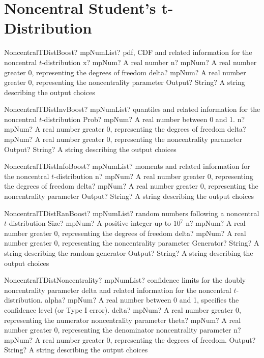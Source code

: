 \documentclass[12pt,a4paper,openany]{book}
\begin{document}
\section{Noncentral Student's t-Distribution}

\begin{mpFunctionsExtract}
\mpFunctionFourNotImplemented
{NoncentralTDistBoost? mpNumList? pdf, CDF and related information for the noncentral $t$-distribution}
{x? mpNum? A real number}
{n? mpNum? A real number greater 0, representing the degrees of freedom}
{delta? mpNum? A real number greater 0, representing the noncentrality parameter}
{Output? String? A string describing the output choices}
\end{mpFunctionsExtract}

\begin{mpFunctionsExtract}
\mpFunctionFourNotImplemented
{NoncentralTDistInvBoost? mpNumList? quantiles and related information for the  noncentral $t$-distribution}
{Prob? mpNum? A real number between 0 and 1.}
{n? mpNum? A real number greater 0, representing the degrees of freedom}
{delta? mpNum? A real number greater 0, representing the noncentrality parameter}
{Output? String? A string describing the output choices}
\end{mpFunctionsExtract}

\begin{mpFunctionsExtract}
\mpFunctionThreeNotImplemented
{NoncentralTDistInfoBoost? mpNumList? moments and related information for the noncentral $t$-distribution}
{n? mpNum? A real number greater 0, representing the degrees of freedom}
{delta? mpNum? A real number greater 0, representing the noncentrality parameter}
{Output? String? A string describing the output choices}
\end{mpFunctionsExtract}

\begin{mpFunctionsExtract}
\mpFunctionFiveNotImplemented
{NoncentralTDistRanBoost? mpNumList? random numbers following a noncentral $t$-distribution}
{Size? mpNum? A positive integer up to $10^7$}
{n? mpNum? A real number greater 0, representing the degrees of freedom}
{delta? mpNum? A real number greater 0, representing the noncentrality parameter}
{Generator? String? A string describing the random generator}
{Output? String? A string describing the output choices}
\end{mpFunctionsExtract}

\begin{mpFunctionsExtract}
\mpFunctionFiveNotImplemented
{NoncentralTDistNoncentrality? mpNumList? confidence limits for the doubly noncentrality parameter delta and related information for the noncentral $t$-distribution.}
{alpha? mpNum? A real number between 0 and 1, specifies the confidence level (or Type I error).}
{delta? mpNum? A real number greater 0, representing the numerator noncentrality parameter}
{theta? mpNum? A real number greater 0, representing the denominator noncentrality parameter}
{n? mpNum? A real number greater 0, representing the degrees of freedom.}
{Output? String? A string describing the output choices}
\end{mpFunctionsExtract}
\end{document}
